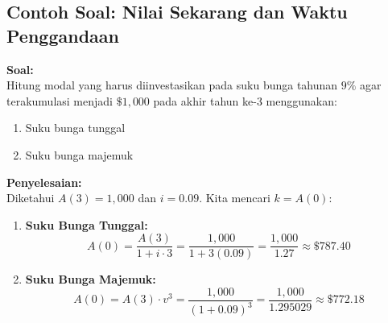 \documentclass[11pt,a4paper]{article}
\begin{document}
\subsection{Contoh Soal: Nilai Sekarang dan Waktu Penggandaan}
\begin{examplebox}
\textbf{Soal:}\\
Hitung modal yang harus diinvestasikan pada suku bunga tahunan $9\%$ agar terakumulasi menjadi $\$1{,}000$ pada akhir tahun ke-3 menggunakan:
\begin{enumerate}[label=(\alph*)]
    \item Suku bunga tunggal
    \item Suku bunga majemuk
\end{enumerate}

\vspace{0.5em}
\textbf{Penyelesaian:}\\
Diketahui $A(3) = 1{,}000$ dan $i = 0.09$. Kita mencari $k = A(0)$:
\begin{enumerate}[label=(\alph*)]
    \item \textbf{Suku Bunga Tunggal:}
    \begin{equation*}
        A(0) = \frac{A(3)}{1 + i \cdot 3} = \frac{1{,}000}{1 + 3(0.09)} = \frac{1{,}000}{1.27} \approx \$787.40
    \end{equation*}
    \item \textbf{Suku Bunga Majemuk:}
    \begin{equation*}
        A(0) = A(3) \cdot v^3 = \frac{1{,}000}{(1 + 0.09)^3} = \frac{1{,}000}{1.295029} \approx \$772.18
    \end{equation*}
\end{enumerate}
\end{examplebox}
\end{document}
